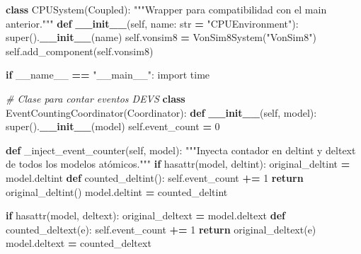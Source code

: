 \documentclass[12pt,oneside]{templates/unerthesis}
\newenvironment{Shaded}{\begin{snugshade}}{\end{snugshade}}
\newcommand{\BuiltInTok}[1]{#1}
\newcommand{\CommentTok}[1]{\textcolor[rgb]{0.56,0.35,0.01}{\textit{#1}}}
\newcommand{\ControlFlowTok}[1]{\textcolor[rgb]{0.13,0.29,0.53}{\textbf{#1}}}
\newcommand{\DecValTok}[1]{\textcolor[rgb]{0.00,0.00,0.81}{#1}}
\newcommand{\FunctionTok}[1]{\textcolor[rgb]{0.13,0.29,0.53}{\textbf{#1}}}
\newcommand{\ImportTok}[1]{#1}
\newcommand{\KeywordTok}[1]{\textcolor[rgb]{0.13,0.29,0.53}{\textbf{#1}}}
\newcommand{\NormalTok}[1]{#1}
\newcommand{\OperatorTok}[1]{\textcolor[rgb]{0.81,0.36,0.00}{\textbf{#1}}}
\newcommand{\StringTok}[1]{\textcolor[rgb]{0.31,0.60,0.02}{#1}}
\newcommand{\VariableTok}[1]{\textcolor[rgb]{0.00,0.00,0.00}{#1}}
\begin{document}
\begin{Shaded}
\begin{Highlighting}[]
\KeywordTok{class}\NormalTok{ CPUSystem(Coupled):}
    \StringTok{"""Wrapper para compatibilidad con el main anterior."""}
    \KeywordTok{def} \FunctionTok{\_\_init\_\_}\NormalTok{(}\VariableTok{self}\NormalTok{, name: }\BuiltInTok{str} \OperatorTok{=} \StringTok{"CPUEnvironment"}\NormalTok{):}
        \BuiltInTok{super}\NormalTok{().}\FunctionTok{\_\_init\_\_}\NormalTok{(name)}
        \VariableTok{self}\NormalTok{.vonsim8 }\OperatorTok{=}\NormalTok{ VonSim8System(}\StringTok{"VonSim8"}\NormalTok{)}
        \VariableTok{self}\NormalTok{.add\_component(}\VariableTok{self}\NormalTok{.vonsim8)}


\ControlFlowTok{if} \VariableTok{\_\_name\_\_} \OperatorTok{==} \StringTok{"\_\_main\_\_"}\NormalTok{:}
    \ImportTok{import}\NormalTok{ time}
    
    \CommentTok{\# Clase para contar eventos DEVS}
    \KeywordTok{class}\NormalTok{ EventCountingCoordinator(Coordinator):}
        \KeywordTok{def} \FunctionTok{\_\_init\_\_}\NormalTok{(}\VariableTok{self}\NormalTok{, model):}
            \BuiltInTok{super}\NormalTok{().}\FunctionTok{\_\_init\_\_}\NormalTok{(model)}
            \VariableTok{self}\NormalTok{.event\_count }\OperatorTok{=} \DecValTok{0}
            
        \KeywordTok{def}\NormalTok{ \_inject\_event\_counter(}\VariableTok{self}\NormalTok{, model):}
            \StringTok{"""Inyecta contador en deltint y deltext de todos}
\StringTok{            los modelos atómicos."""}
            \ControlFlowTok{if} \BuiltInTok{hasattr}\NormalTok{(model, }\StringTok{\textquotesingle{}deltint\textquotesingle{}}\NormalTok{):}
\NormalTok{                original\_deltint }\OperatorTok{=}\NormalTok{ model.deltint}
                \KeywordTok{def}\NormalTok{ counted\_deltint():}
                    \VariableTok{self}\NormalTok{.event\_count }\OperatorTok{+=} \DecValTok{1}
                    \ControlFlowTok{return}\NormalTok{ original\_deltint()}
\NormalTok{                model.deltint }\OperatorTok{=}\NormalTok{ counted\_deltint}
            
            \ControlFlowTok{if} \BuiltInTok{hasattr}\NormalTok{(model, }\StringTok{\textquotesingle{}deltext\textquotesingle{}}\NormalTok{):}
\NormalTok{                original\_deltext }\OperatorTok{=}\NormalTok{ model.deltext}
                \KeywordTok{def}\NormalTok{ counted\_deltext(e):}
                    \VariableTok{self}\NormalTok{.event\_count }\OperatorTok{+=} \DecValTok{1}
                    \ControlFlowTok{return}\NormalTok{ original\_deltext(e)}
\NormalTok{                model.deltext }\OperatorTok{=}\NormalTok{ counted\_deltext}
            

\end{Highlighting}
\end{Shaded}
\end{document}
